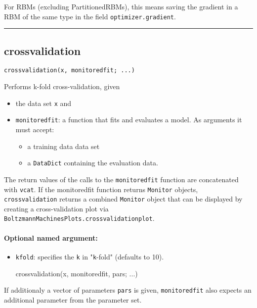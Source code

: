 For RBMs (excluding PartitionedRBMs), this means saving the gradient in a RBM of the same type in the field \texttt{optimizer.\allowbreak gradient}.

\noindent\rule{\textwidth}{1pt}
\subsection*{crossvalidation}  \label{bms_crossvalidation}
\begin{verbatim}
crossvalidation(x, monitoredfit; ...)
\end{verbatim}
Performs k-fold cross-validation, given

\begin{itemize}
\item the data set \texttt{x} and


\item \texttt{monitoredfit}: a function that fits and evaluates a model. As arguments it must accept:

\begin{itemize}
\item a training data data set


\item a \texttt{DataDict} containing the evaluation data.

\end{itemize}
\end{itemize}
The return values of the calls to the \texttt{monitoredfit} function are concatenated with \texttt{vcat}. If the monitoredfit function returns \texttt{Monitor} objects, \texttt{crossvalidation} returns a combined \texttt{Monitor} object that can be displayed by creating a cross-validation plot via \texttt{BoltzmannMachinesPlots.\allowbreak crossvalidationplot}.

\paragraph*{Optional named argument:}
\begin{itemize}
\item \texttt{kfold}: specifies the \texttt{k} in "\texttt{k}-fold" (defaults to 10).

crossvalidation(x, monitoredfit, pars; ...)

\end{itemize}
If additionaly a vector of parameters \texttt{pars} is given, \texttt{monitoredfit} also expects an additional parameter from the parameter set.

